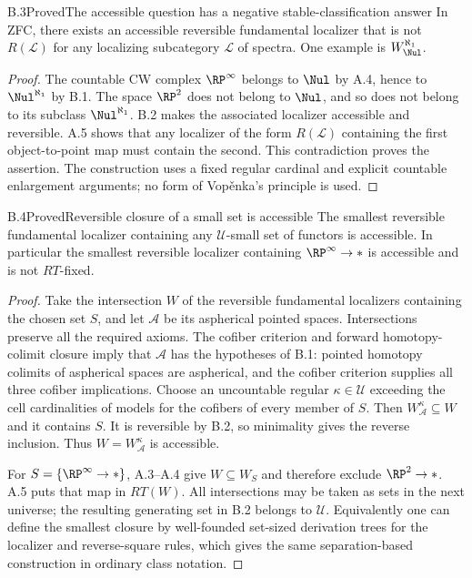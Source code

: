 \begin{claim}{B.3}{Proved}{The accessible question has a negative stable-classification answer}\label{B3}
In ZFC, there exists an accessible reversible fundamental localizer that is not $R(\mathcal L)$ for any localizing subcategory $\mathcal L$ of spectra. One example is $W^{\aleph_1}_{\Nul}$.
\end{claim}
\begin{proof}
The countable CW complex $\RP^\infty$ belongs to $\Nul$ by A.4, hence to $\Nul^{\aleph_1}$ by B.1. The space $\RP^2$ does not belong to $\Nul$, and so does not belong to its subclass $\Nul^{\aleph_1}$. B.2 makes the associated localizer accessible and reversible. A.5 shows that any localizer of the form $R(\mathcal L)$ containing the first object-to-point map must contain the second. This contradiction proves the assertion. The construction uses a fixed regular cardinal and explicit countable enlargement arguments; no form of Vop\v enka's principle is used.
\end{proof}

\begin{claim}{B.4}{Proved}{Reversible closure of a small set is accessible}\label{B4}
The smallest reversible fundamental localizer containing any $\mathcal U$-small set of functors is accessible. In particular the smallest reversible localizer containing $\RP^\infty\to *$ is accessible and is not $RT$-fixed.
\end{claim}
\begin{proof}
Take the intersection $W$ of the reversible fundamental localizers containing the chosen set $S$, and let $\mathcal A$ be its aspherical pointed spaces. Intersections preserve all the required axioms. The cofiber criterion and forward homotopy-colimit closure imply that $\mathcal A$ has the hypotheses of B.1: pointed homotopy colimits of aspherical spaces are aspherical, and the cofiber criterion supplies all three cofiber implications. Choose an uncountable regular $\kappa\in\mathcal U$ exceeding the cell cardinalities of models for the cofibers of every member of $S$. Then $W^\kappa_{\mathcal A}\subseteq W$ and it contains $S$. It is reversible by B.2, so minimality gives the reverse inclusion. Thus $W=W^\kappa_{\mathcal A}$ is accessible.

For $S=\{\RP^\infty\to *\}$, A.3--A.4 give $W\subseteq W_S$ and therefore exclude $\RP^2\to *$. A.5 puts that map in $RT(W)$. All intersections may be taken as sets in the next universe; the resulting generating set in B.2 belongs to $\mathcal U$. Equivalently one can define the smallest closure by well-founded set-sized derivation trees for the localizer and reverse-square rules, which gives the same separation-based construction in ordinary class notation.
\end{proof}
